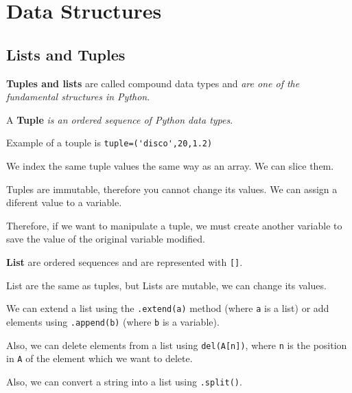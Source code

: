 \documentclass[../../data_analysis_python.tex]{subfiles}
\begin{document}
    \chapter{Data Structures}

    \section{Lists and Tuples}

    \textbf{Tuples and lists} are called compound data types and \textit{are one of the fundamental structures in Python}.

    \begin{mydef}
        A \textbf{Tuple} \textit{is an ordered sequence of Python data types}.
    \end{mydef}

    \begin{exa}
        Example of a touple is \lstinline|tuple=('disco',20,1.2)|
    \end{exa}

    We index the same tuple values the same way as an array. We can slice them.

    \begin{obs}
        Tuples are immutable, therefore you cannot change its values. We can assign a diferent value to a variable.

        Therefore, if we want to manipulate a tuple, we must create another variable to save the value of the original variable modified.
    \end{obs}

    \begin{mydef}
        \textbf{List} are ordered sequences and are represented with \lstinline|[]|.
    \end{mydef}

    List are the same as tuples, but Lists are mutable, we can change its   values.

    \begin{obs}
        We can extend a list using the \lstinline|.extend(a)| method (where \lstinline|a| is a list) or add elements using \lstinline|.append(b)| (where \lstinline|b| is a variable).
    \end{obs}

    Also, we can delete elements from a list using \lstinline|del(A[n])|, where \lstinline|n| is the position in \lstinline|A| of the element which we want to delete.

    \begin{obs}
        Also, we can convert a string into a list using \lstinline|.split()|.
    \end{obs}
\end{document}
